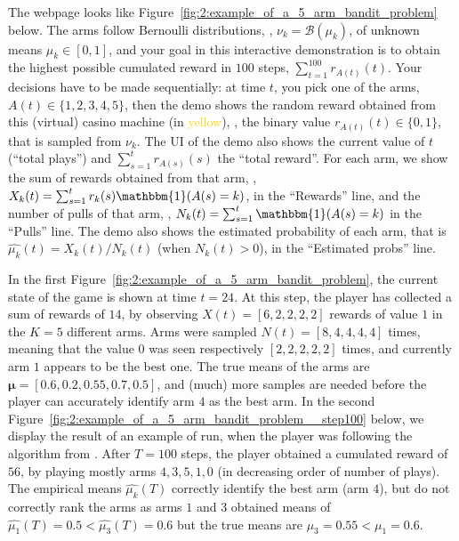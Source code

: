 The webpage looks like Figure~\ref{fig:2:example_of_a_5_arm_bandit_problem} below.
The arms follow Bernoulli distributions, \ie, $\nu_k = \mathcal{B}(\mu_k)$, of unknown means $\mu_k\in[0,1]$, and your goal in this interactive demonstration is to obtain the highest possible cumulated reward in $100$ steps, $\sum_{t=1}^{100} r_{A(t)}(t)$.
Your decisions have to be made sequentially: at time $t$, you pick one of the arms, $A(t) \in\{1,2,3,4,5\}$, then the demo shows the random reward obtained from this (virtual) casino machine (in \textcolor{gold}{yellow}), \ie, the binary value $r_{A(t)}(t)\in\{0,1\}$, that is sampled \iid{} from $\nu_k$.
%
The UI of the demo also shows the current value of $t$ (``total plays'') and $\sum_{s=1}^t r_{A(s)}(s)$ the ``total reward''.
For each arm, we show the sum of rewards obtained from that arm, \ie, $X_k(t) = \sum_{s=1}^t r_k(s) \mathbbm{1}(A(s) = k)$, in the ``Rewards'' line, and the number of pulls of that arm, \ie, $N_k(t) = \sum_{s=1}^t \mathbbm{1}(A(s) = k)$ in the ``Pulls'' line.
%
The demo also shows the estimated probability of each arm, that is $\widehat{\mu_k}(t) = X_k(t) / N_k(t)$ (when $N_k(t)>0$), in the ``Estimated probs'' line.

In the first Figure~\ref{fig:2:example_of_a_5_arm_bandit_problem}, the current state of the game is shown at time $t=24$.
At this step, the player has collected a sum of rewards of $14$, by observing $X(t) = [6,2,2,2,2]$ rewards of value $1$ in the $K=5$ different arms. Arms were sampled $N(t) = [8,4,4,4,4]$ times, meaning that the value $0$ was seen respectively $[2,2,2,2,2]$ times, and currently arm $1$ appears to be the best one. The true means of the arms are $\bm{\mu}=[0.6, 0.2, 0.55, 0.7, 0.5]$, and (much) more samples are needed before the player can accurately identify arm $4$ as the best arm.
%
In the second Figure~\ref{fig:2:example_of_a_5_arm_bandit_problem__step100} below, we display the result of an example of run, when the player was following the \UCB{} algorithm from \cite{Auer02}.
After $T=100$ steps, the player obtained a cumulated reward of $56$, by playing mostly arms $4,3,5,1,0$ (in decreasing order of number of plays). The empirical means $\widehat{\mu_k}(T)$ correctly identify the best arm (arm $4$), but do not correctly rank the arms as arms $1$ and $3$ obtained means of $\widehat{\mu_1}(T) = 0.5 < \widehat{\mu_3}(T)=0.6$ but the true means are $\mu_3 = 0.55 < \mu_1 = 0.6$.

